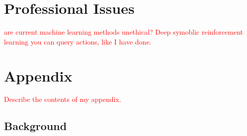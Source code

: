 \documentclass[]{final_report}
\begin{document}
\newpage
{}

\label{endpage}

\chapter{Professional Issues}
\textcolor{red}{are current machine learning methods unethical? Deep symoblic reinforcement learning you can query actions, like I have done.}


\chapter{Appendix}
\label{appendix}
\textcolor{red}{Describe the contents of my appendix.}
\section{Background}
\end{document}
